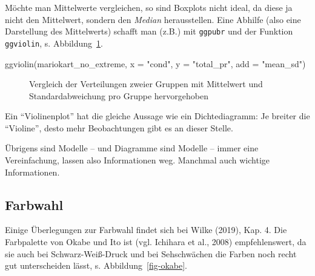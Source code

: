 \documentclass[
  letterpaper,
  oneside,
  open=any]{scrbook}
\newenvironment{Shaded}{\begin{snugshade}}{\end{snugshade}}
\newcommand{\AttributeTok}[1]{\textcolor[rgb]{0.40,0.45,0.13}{#1}}
\newcommand{\FunctionTok}[1]{\textcolor[rgb]{0.28,0.35,0.67}{#1}}
\newcommand{\NormalTok}[1]{\textcolor[rgb]{0.00,0.23,0.31}{#1}}
\newcommand{\StringTok}[1]{\textcolor[rgb]{0.13,0.47,0.30}{#1}}
\theoremstyle{definition}
\theoremstyle{definition}
\theoremstyle{definition}
\theoremstyle{remark}
\begin{document}
Möchte man Mittelwerte vergleichen, so sind Boxplots nicht ideal, da
diese ja nicht den Mittelwert, sondern den \emph{Median} herausstellen.
Eine Abhilfe (also eine Darstellung des Mittelwerts) schafft man (z.B.)
mit \texttt{ggpubr} und der Funktion \texttt{ggviolin}, s.
Abbildung~\ref{fig-comp-means-ggpubr}.

\begin{Shaded}
\begin{Highlighting}[]
\FunctionTok{ggviolin}\NormalTok{(mariokart\_no\_extreme, }
         \AttributeTok{x =} \StringTok{"cond"}\NormalTok{, }\AttributeTok{y =} \StringTok{"total\_pr"}\NormalTok{, }\AttributeTok{add =} \StringTok{"mean\_sd"}\NormalTok{) }
\end{Highlighting}
\end{Shaded}

\begin{figure}[H]


\caption{\label{fig-comp-means-ggpubr}Vergleich der Verteilungen zweier
Gruppen mit Mittelwert und Standardabweichung pro Gruppe hervorgehoben}

\end{figure}%

Ein \enquote{Violinenplot} hat die gleiche Aussage wie ein
Dichtediagramm: Je breiter die \enquote{Violine}, desto mehr
Beobachtungen gibt es an dieser Stelle.

Übrigens sind Modelle -- und Diagramme sind Modelle -- immer eine
Vereinfachung, lassen also Informationen weg. Manchmal auch wichtige
Informationen.

\subsection{Farbwahl}\label{sec-farbwahl}

Einige Überlegungen zur Farbwahl findet sich bei Wilke (2019), Kap. 4.
Die Farbpalette von Okabe und Ito ist (vgl. Ichihara et al., 2008)
empfehlenswert, da sie auch bei Schwarz-Weiß-Druck und bei Sehschwächen
die Farben noch recht gut unterscheiden lässt, s.
Abbildung~\ref{fig-okabe}.
\end{document}
